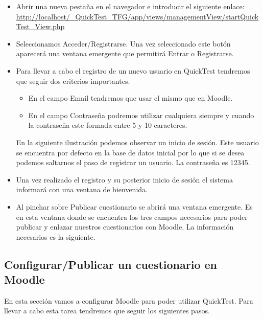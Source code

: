 \begin{itemize}

	\item Abrir una nueva pestaña en el navegador e introducir el siguiente enlace: \url{http://localhost/_QuickTest_TFG/app/views/managementView/startQuickTest_View.php}
	
	\item Seleccionamos Acceder/Registrarse. Una vez seleccionado este botón aparecerá una ventana emergente que permitirá Entrar o Registrarse.
	
	\item Para llevar a cabo el registro de un nuevo usuario en QuickTest tendremos que seguir dos criterios importantes.
	\begin{itemize}
         \item En el campo Email tendremos que usar el mismo que en Moodle.
         \item En el campo Contraseña podremos utilizar cualquiera siempre y cuando la contraseña este formada entre 5 y 10 caracteres.
    \end{itemize}
    En la siguiente ilustración podemos observar un inicio de sesión. Este usuario se encuentra por defecto en la base de datos inicial por lo que si se desea podemos saltarnos el paso de registrar un usuario. La contraseña es 12345. 
    \item Una vez realizado el registro y su posterior inicio de sesión el sistema informará con una ventana de bienvenida. 
    
    \item Al pinchar sobre Publicar cuestionario se abrirá una ventana emergente. Es en esta ventana donde se encuentra los tres campos necesarios para poder publicar y enlazar nuestros cuestionarios con Moodle. La información necesarios es la siguiente. 
    
	
\end{itemize}


\subsection{Configurar/Publicar un cuestionario en Moodle}

En esta sección vamos a configurar Moodle para poder utilizar QuickTest. Para llevar a cabo esta tarea tendremos que seguir los siguientes pasos.


